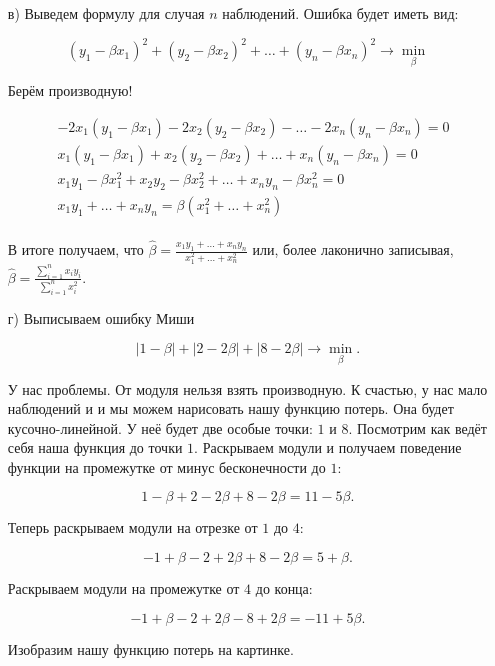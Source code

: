 \documentclass[12pt, a4paper, oneside]{article}
\begin{document}
{\begin{enumerate}
	
	\item[в)]  Выведем формулу для случая $n$ наблюдений. Ошибка будет иметь вид: 
	
	\[(y_1 - \beta x_1)^2 + (y_2 - \beta x_2)^2 + \ldots + (y_n - \beta x_n )^2 \to \min_{\beta} \]
	
	Берём производную! 
	
	\begin{equation*}
	\begin{aligned}
	&  -2 x_1 (y_1 - \beta x_1) - 2 x_2 (y_2 - \beta x_2) - \ldots -2 x_n (y_n - \beta x_n) = 0 \\
	& x_1 (y_1 - \beta x_1) +  x_2 (y_2 - \beta x_2) + \ldots +  x_n (y_n - \beta x_n) = 0  \\
	& x_1 y_1 - \beta x_1^2 + x_2 y_2 - \beta x_2^2 + \ldots + x_n y_n - \beta x_n^2 = 0\\
	& x_1 y_1 + \ldots + x_n y_n = \beta (x_1^2 + \ldots + x_n^2) \\
	\end{aligned}
	\end{equation*}
	
	В итоге получаем, что $\hat \beta = \frac{x_1 y_1 + \ldots + x_n y_n}{x_1^2 + \ldots + x_n^2}$ или, более лаконично записывая, $\hat \beta = \frac{\sum_{i=1}^{n} x_i y_i }{\sum_{i=1}^n x_i^2}.$
	
	\item[г)] Выписываем ошибку Миши
	
	\[ |1- \beta| + |2 - 2 \beta| + |8 - 2 \beta|  \to \min_{\beta}. \]
	
	У нас проблемы. От модуля нельзя взять производную. К счастью, у нас мало наблюдений и и мы можем нарисовать нашу функцию потерь. Она будет кусочно-линейной. У неё будет две особые точки: $1$ и $8$.  Посмотрим как ведёт себя наша функция до точки $1$. Раскрываем модули и получаем поведение функции на промежутке от минус бесконечности до $1$: 
	
	\[ 1 - \beta + 2 - 2\beta + 8 - 2\beta = 11 - 5\beta.\] 	
	
	Теперь раскрываем модули на отрезке от $1$ до $4$: 
	
	\[ - 1 + \beta - 2 + 2\beta + 8 - 2\beta = 5 + \beta.\] 
	
	Раскрываем модули на промежутке от $4$ до конца: 
	
	\[ - 1 + \beta - 2 + 2\beta  - 8 + 2\beta = -11 + 5 \beta. \]
	
	Изобразим нашу функцию потерь на картинке. 
	

\end{enumerate}}
\end{document}
